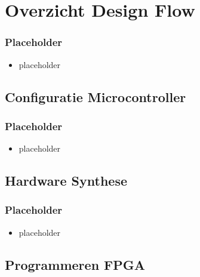 \documentclass{beamer}
\begin{document}
\section{Overzicht Design Flow}

\begin{frame} 
\frametitle{Placeholder}
  \begin{itemize}[<+->]
    \item placeholder
  \end{itemize}
\end{frame}

\subsection{Configuratie Microcontroller}

\begin{frame} 
\frametitle{Placeholder}
  \begin{itemize}[<+->]
    \item placeholder
  \end{itemize}
\end{frame}

\subsection{Hardware Synthese}

\begin{frame} 
\frametitle{Placeholder}
  \begin{itemize}[<+->]
    \item placeholder
  \end{itemize}
\end{frame}

\subsection{Programmeren FPGA}
\end{document}
